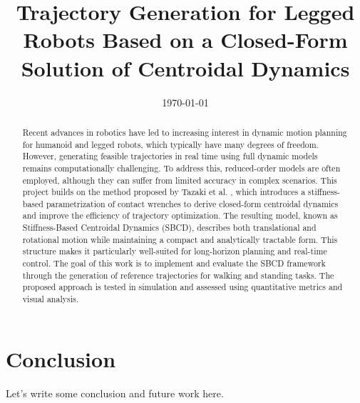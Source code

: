 \documentclass[12pt,a4paper,oneside]{article}
\title{Trajectory Generation for Legged Robots Based on a  Closed-Form Solution of Centroidal Dynamics}	                                    %
\date{\today}									    %
\theoremstyle{definition}
\theoremstyle{remark} %
\begin{document}

\newpage
\tableofcontents
\newpage
\begin{abstract}
\begin{sloppypar}
\noindent
Recent advances in robotics have led to increasing interest in dynamic motion planning for humanoid and legged robots, which typically have many degrees of freedom. However, generating feasible trajectories in real time using full dynamic models remains computationally challenging. To address this, reduced-order models are often employed, although they can suffer from limited accuracy in complex scenarios. This project builds on the method proposed by Tazaki et al. \cite{tazaki2024trajectory}, which introduces a stiffness-based parametrization of contact wrenches to derive closed-form centroidal dynamics and improve the efficiency of trajectory optimization. The resulting model, known as Stiffness-Based Centroidal Dynamics (SBCD), describes both translational and rotational motion while maintaining a compact and analytically tractable form. This structure makes it particularly well-suited for long-horizon planning and real-time control. The goal of this work is to implement and evaluate the SBCD framework through the generation of reference trajectories for walking and standing tasks. The proposed approach is tested in simulation and assessed using quantitative metrics and visual analysis.
\end{sloppypar}
\end{abstract}
\newpage

\clearpage

\clearpage

\clearpage

\clearpage

\clearpage
\section{Conclusion}
\label{sec:conclusion}
Let's write some conclusion and future work here. 
\clearpage



\end{document}
